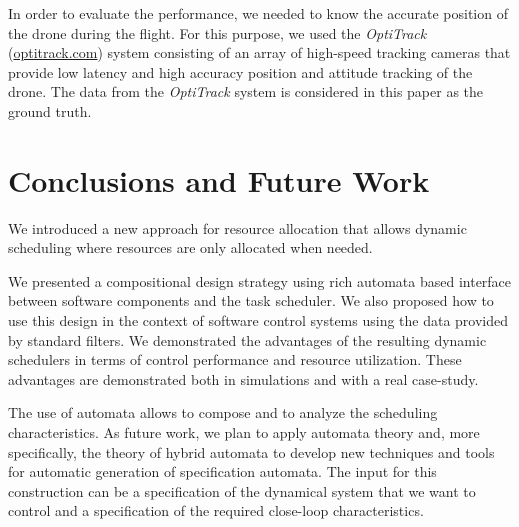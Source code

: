\documentclass{sig-alternate-ipsn13}
\begin{document}
In order to evaluate the performance, we needed to know the accurate position of the drone during the flight. For this purpose, we used the \textit{OptiTrack} (\url{optitrack.com}) system 
consisting of an array of high-speed tracking cameras that provide low latency and high accuracy position and attitude tracking of the drone. The data from the \textit{OptiTrack} system is considered in this paper as the ground truth.

\section{Conclusions and Future Work}
We introduced a new approach for resource allocation that allows dynamic scheduling where resources are only allocated when needed.

We presented a compositional design strategy using rich automata based interface between software components and the task scheduler. We also proposed how to use this design in the context of software control systems using the data provided by standard filters.
We demonstrated the advantages of the resulting dynamic schedulers in terms of control performance and resource utilization. These advantages are demonstrated both in simulations and with a real case-study.

The use of automata allows to compose and to analyze the scheduling characteristics. As future work, we plan to apply automata theory and, more specifically, the theory of hybrid automata to develop new techniques and tools for automatic generation of specification automata. The input for this construction can be a specification of the dynamical system that we want to control and a specification of the required close-loop characteristics. 



%

%
%
%

\end{document}
